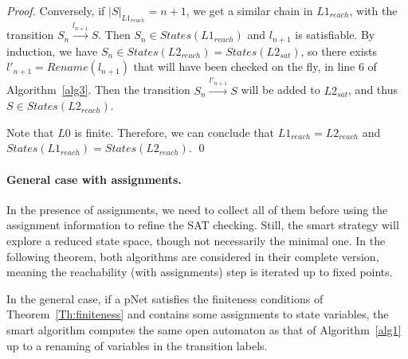 \documentclass[smallcondensed]{svjour3}
\begin{document}
\begin{proof}
  Conversely, if $|S|_{L1_{reach}}=n+1$, we get a similar chain in
  $L1_{reach}$, with the transition $S_n \xrightarrow{l_{n+1}}S$.  Then $ S_n \in
  States(L1_{reach})$ and $l_{n+1}$ is satisfiable. By induction, we have
  $S_n \in States(L2_{reach})=States(L2_{sat})$, so there exists
  $l'_{n+1}=Rename(l_{n+1})$ that will have
  been checked on the fly, in line 6 of Algorithm~\ref{alg3}. Then
  the transition $S_n \xrightarrow{l'_{n+1}}S$ will be added to
  $L2_{sat}$, and thus $S \in States(L2_{reach})$. 
  
Note that $L0$ is finite. Therefore, we can conclude that $L1_{reach}=L2_{reach}$ and
$States(L1_{reach})=States(L2_{reach})$. 
\hfill\qed
\end{proof}

\paragraph{General case with assignments.}
In the presence of assignments, we need to collect all of them
  before using the assignment information to refine the SAT
  checking. Still, the smart strategy will explore a reduced state
  space, though not necessarily the minimal one. In the
  following theorem, both algorithms are considered in their complete
  version, meaning the reachability (with assignments) step is
  iterated up to fixed points.
  
\begin{theorem}
  \label{Th:CorrectnessWithAssignments}
In the general case, if a pNet satisfies the finiteness conditions of Theorem~\ref{Th:finiteness} and contains some assignments to state variables, the smart algorithm computes 
the same open automaton as that of Algorithm~\ref{alg1} up to a renaming of variables in the transition labels.
\end{theorem}
\end{document}
